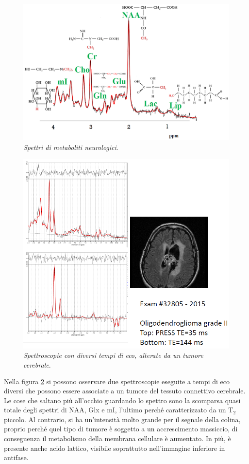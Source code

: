\documentclass{report}
\newcommand{\figref}[1]{figura \ref{#1}}
\numberwithin{equation}{section}
\numberwithin{figure}{section}
\begin{document}
\begin{figure}[htp]
\centering
\includegraphics[scale=0.63]{immagini/spettro.png}
\caption{\label{fig:spettro} \textit{Spettri di metaboliti neurologici}.}
\end{figure}

\begin{figure}[htp]
\centering
\includegraphics[scale=0.8]{immagini/tum.png}
\caption{\label{fig:tum} \textit{Spettroscopie con diversi tempi di eco, alterate da un tumore cerebrale}.}
\end{figure}

Nella \figref{fig:tum} si possono osservare due spettroscopie eseguite a tempi di eco diversi che possono essere associate a un tumore del tessuto connettivo cerebrale. Le cose che saltano più all'occhio guardando lo spettro sono la scomparsa quasi totale degli spettri di NAA, Glx e mI, l'ultimo perché caratterizzato da un $\mathrm{T_2}$ piccolo. Al contrario, si ha un'intensità molto grande per il segnale della colina, proprio perché quel tipo di tumore è soggetto a un accrescimento massiccio, di conseguenza il metabolismo della membrana cellulare è aumentato. In più, è presente anche acido lattico, visibile soprattutto nell'immagine inferiore in antifase.
\end{document}
